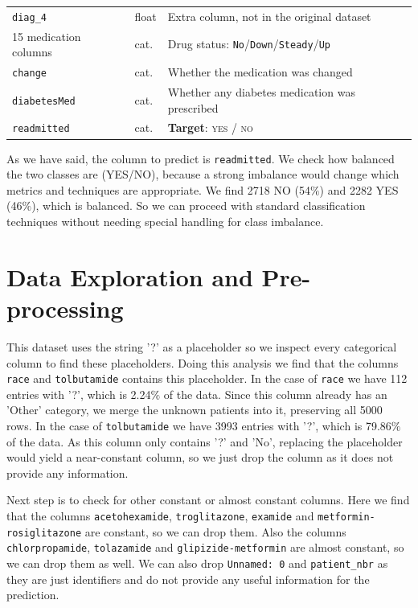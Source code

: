 \documentclass[11pt,a4paper]{article}
\begin{document}
\begin{table}[htbp]
\begin{tabular}{@{}lll@{}}
\texttt{diag\_4}                                      & float & Extra column, not in the original dataset \\
15 medication columns                                 & cat.  & Drug status: \texttt{No}/\texttt{Down}/\texttt{Steady}/\texttt{Up} \\
\texttt{change}                                       & cat.  & Whether the medication was changed \\
\texttt{diabetesMed}                                  & cat.  & Whether any diabetes medication was prescribed \\
\texttt{readmitted}                                   & cat.  & \textbf{Target}: \textsc{yes} / \textsc{no} \\
\bottomrule
\end{tabular}
\end{table}

As we have said, the column to predict is \texttt{readmitted}. We check how balanced the two classes are (YES/NO), because
a strong imbalance would change which metrics and techniques are appropriate. We find 2718 NO (54$\%$) and 2282 YES (46$\%$), which is balanced.
So we can proceed with standard classification techniques without needing special handling for class imbalance.

\section{Data Exploration and Pre-processing}

This dataset uses the string '?' as a
placeholder so  we inspect every categorical column to find these placeholders.
Doing this analysis we find that the columns \texttt{race} and \texttt{tolbutamide} contains this placeholder.
In the case of \texttt{race} we have 112 entries with '?', which is 2.24$\%$ of the data. Since this column already has
an 'Other' category, we merge the unknown patients into it, preserving all 5000 rows.
In the case of \texttt{tolbutamide} we have 3993 entries with '?', which is 79.86$\%$ of the data. As this column only contains
'?' and 'No', replacing the placeholder would yield a near-constant column,
so we just drop the column as it does not provide any information.

Next step is to check for other constant or almost constant columns.
Here we find that the columns
\texttt{acetohexamide}, \texttt{troglitazone}, \texttt{examide} and \texttt{metformin-rosiglitazone} are constant,
so we can drop them. Also the columns \texttt{chlorpropamide}, \texttt{tolazamide} and \texttt{glipizide-metformin} are almost
constant, so we can drop them as well. We can also drop \texttt{Unnamed: 0} and \texttt{patient\_nbr} as they are just identifiers and
do not provide any useful information for the prediction.
\end{document}
